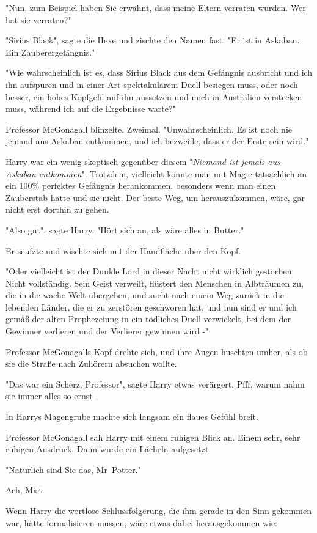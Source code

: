 {"Nun, zum Beispiel haben Sie erwähnt, dass meine Eltern verraten wurden. Wer hat sie verraten?"

"Sirius Black", sagte die Hexe und zischte den Namen fast. "Er ist in Askaban. Ein Zauberergefängnis."

"Wie wahrscheinlich ist es, dass Sirius Black aus dem Gefängnis ausbricht und ich ihn aufspüren und in einer Art spektakulärem Duell besiegen muss, oder noch besser, ein hohes Kopfgeld auf ihn aussetzen und mich in Australien verstecken muss, während ich auf die Ergebnisse warte?"

Professor McGonagall blinzelte. Zweimal. "Unwahrscheinlich. Es ist noch nie jemand aus Askaban entkommen, und ich bezweifle, dass er der Erste sein wird."

Harry war ein wenig skeptisch gegenüber diesem "\emph{Niemand ist jemals aus Askaban entkommen}". Trotzdem, vielleicht konnte man mit Magie tatsächlich an ein 100\% perfektes Gefängnis herankommen, besonders wenn man einen Zauberstab hatte und sie nicht. Der beste Weg, um herauszukommen, wäre, gar nicht erst dorthin zu gehen.

"Also gut", sagte Harry. "Hört sich an, als wäre alles in Butter."

Er seufzte und wischte sich mit der Handfläche über den Kopf.

"Oder vielleicht ist der Dunkle Lord in dieser Nacht nicht wirklich gestorben. Nicht vollständig. Sein Geist verweilt, flüstert den Menschen in Albträumen zu, die in die wache Welt übergehen, und sucht nach einem Weg zurück in die lebenden Länder, die er zu zerstören geschworen hat, und nun sind er und ich gemäß der alten Prophezeiung in ein tödliches Duell verwickelt, bei dem der Gewinner verlieren und der Verlierer gewinnen wird -"

Professor McGonagalls Kopf drehte sich, und ihre Augen huschten umher, als ob sie die Straße nach Zuhörern absuchen wollte.

"Das war ein Scherz, Professor", sagte Harry etwas verärgert. Pfff, warum nahm sie immer alles so ernst -

In Harrys Magengrube machte sich langsam ein flaues Gefühl breit.

Professor McGonagall sah Harry mit einem ruhigen Blick an. Einem sehr, sehr ruhigen Ausdruck. Dann wurde ein Lächeln aufgesetzt.

"Natürlich sind Sie das, Mr~Potter."

Ach, Mist.

Wenn Harry die wortlose Schlussfolgerung, die ihm gerade in den Sinn gekommen war, hätte formalisieren müssen, wäre etwas dabei herausgekommen wie:

}
